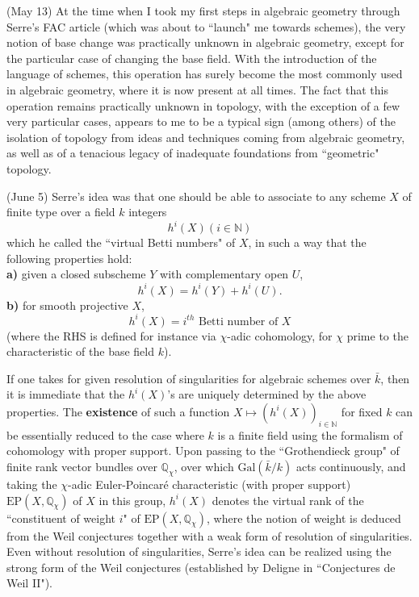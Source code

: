 \label{note:46.8}

(May 13) At the time when I took my first steps in algebraic geometry through Serre's FAC article (which was about to ``launch" me towards schemes), the very notion of base change was practically unknown in algebraic geometry, except for the particular case of changing the base field. With the introduction of the language of schemes, this operation has surely become the most commonly used in algebraic geometry, where it is now present at all times. The fact that this operation remains practically unknown in topology, with the exception of a few very particular cases, appears to me to be a typical sign (among others) of the isolation of topology from ideas and techniques coming from algebraic geometry, as well as of a tenacious legacy of inadequate foundations from ``geometric" topology. 

\label{note:46.9}

(June 5) Serre's idea was that one should be able to associate to any scheme $X$ of finite type over a field $k$ integers
$$ h^i(X) (i \in \mathbb{N})$$
which he called the ``virtual Betti numbers" of $X$, in such a way that the following properties hold: \\
\textbf{a)} given a closed subscheme $Y$ with complementary open $U$,
$$ h^i(X) = h^i(Y) + h^i(U). $$
\textbf{b)} for smooth projective $X$,
$$ h^i(X) = i^{th} \text{ Betti number of } X $$
(where the RHS is defined for instance via $\chi$-adic cohomology, for $\chi$ prime to the characteristic of the base field $k$).

If one takes for given resolution of singularities for algebraic schemes over $\bar{k}$, then it is immediate that the $h^i(X)$'s are uniquely determined by the above properties. The \textbf{existence} of such a function $X \mapsto (h^i(X))_{i \in \mathbb{N}}$ for fixed $k$ can be essentially reduced to the case where $k$ is a finite field using the formalism of cohomology with proper support. Upon passing to the ``Grothendieck group" of finite rank vector bundles over $\mathbb{Q}_\chi$, over which $\text{Gal}(\bar{k}/k)$ acts continuously, and taking the $\chi$-adic Euler-Poincar\'e characteristic (with proper support) $\text{EP}(X, \mathbb{Q}_\chi)$ of $X$ in this group, $h^i(X)$ denotes the virtual rank of the ``constituent of weight $i$" of $\text{EP}(X, \mathbb{Q}_\chi)$, where the notion of weight is deduced from the Weil conjectures together with a weak form of resolution of singularities. Even without resolution of singularities, Serre's idea can be realized using the strong form of the Weil conjectures (established by Deligne in ``Conjectures de Weil II").

